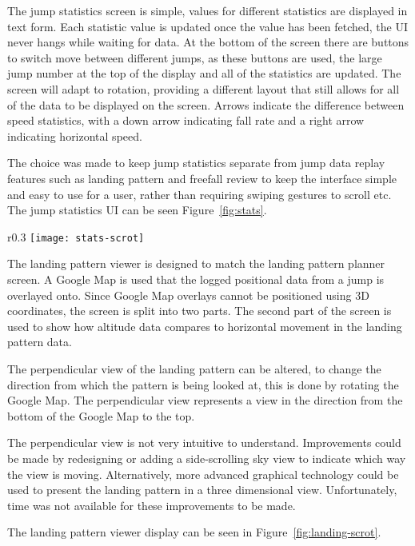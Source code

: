 The jump statistics screen is simple, values for different statistics are displayed in text form. Each statistic value is updated once the value has been fetched, the UI never hangs while waiting for data. At the bottom of the screen there are buttons to switch move between different jumps, as these buttons are used, the large jump number at the top of the display and all of the statistics are updated. The screen will adapt to rotation, providing a different layout that still allows for all of the data to be displayed on the screen. Arrows indicate the difference between speed statistics, with a down arrow indicating fall rate and a right arrow indicating horizontal speed.

The choice was made to keep jump statistics separate from jump data replay features such as landing pattern and freefall review to keep the interface simple and easy to use for a user, rather than requiring swiping gestures to scroll etc.
The jump statistics UI can be seen Figure~\ref{fig:stats}.

\begin{wrapfigure}{r}{0.3\textwidth}
  \centering
  \texttt{[image: stats-scrot]}
  \caption{The jump statistics screen.}\label{fig:stats}
\end{wrapfigure}

The landing pattern viewer is designed to match the landing pattern planner screen. A Google Map is used that the logged positional data from a jump is overlayed onto. Since Google Map overlays cannot be positioned using 3D coordinates, the screen is split into two parts. The second part of the screen is used to show how altitude data compares to horizontal movement in the landing pattern data.

The perpendicular view of the landing pattern can be altered, to change the direction from which the pattern is being looked at, this is done by rotating the Google Map. The perpendicular view represents a view in the direction from the bottom of the Google Map to the top.

The perpendicular view is not very intuitive to understand. Improvements could be made by redesigning or adding a side-scrolling sky view to indicate which way the view is moving. Alternatively, more advanced graphical technology could be used to present the landing pattern in a three dimensional view. Unfortunately, time was not available for these improvements to be made.

The landing pattern viewer display can be seen in Figure~\ref{fig:landing-scrot}.


